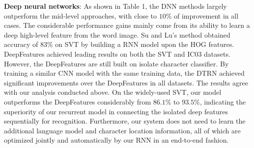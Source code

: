 \documentclass[letterpaper]{article}
\begin{document}
\textbf{Deep neural networks}: As shown in Table 1, the DNN methods largely outperform the mid-level approaches, with close to $10\%$ of improvement in all cases. The considerable performance gains mainly come from its ability to learn a deep high-level feature from the word image. Su and Lu's method obtained accuracy of $83\%$ on SVT by building a RNN model upon the HOG features. DeepFeatures achieved leading results on both the SVT and IC03 datasets. However, the DeepFeatures are still built on isolate character classifier. By training a similar CNN model with the same training data, the DTRN achieved significant improvements over the DeepFeatures in all datasets. The results agree with our analysis conducted above. On the widely-used SVT, our model outperforms the DeepFeatures considerably from $86.1\%$ to $93.5\%$, indicating the superiority of our recurrent model in connecting the isolated deep features sequentially for recognition.  Furthermore, our system does not need to learn the additional language model and character location information, all of which are optimized jointly and automatically by our RNN in an end-to-end fashion.
\end{document}
